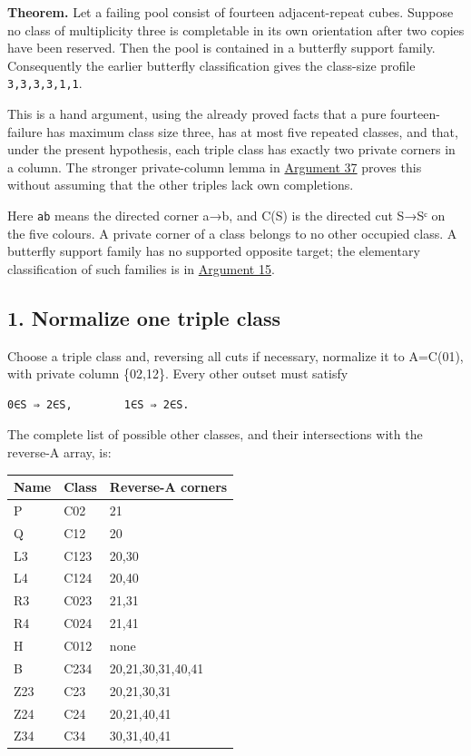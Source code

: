 \documentclass[
  10pt,
]{article}
\begin{document}
\textbf{Theorem.} Let a failing pool consist of fourteen adjacent-repeat
cubes. Suppose no class of multiplicity three is completable in its own
orientation after two copies have been reserved. Then the pool is
contained in a butterfly support family. Consequently the earlier
butterfly classification gives the class-size profile
\texttt{3,3,3,3,1,1}.

This is a hand argument, using the already proved facts that a pure
fourteen-failure has maximum class size three, has at most five repeated
classes, and that, under the present hypothesis, each triple class has
exactly two private corners in a column. The stronger private-column
lemma in \protect\hyperlink{arg-37}{Argument 37} proves this without
assuming that the other triples lack own completions.

Here \texttt{ab} means the directed corner a→b, and C(S) is the directed
cut S→Sᶜ on the five colours. A private corner of a class belongs to no
other occupied class. A butterfly support family has no supported
opposite target; the elementary classification of such families is in
\protect\hyperlink{arg-15}{Argument 15}.

\hypertarget{normalize-one-triple-class}{%
\subsection*{1. Normalize one triple
class}\label{normalize-one-triple-class}}

Choose a triple class and, reversing all cuts if necessary, normalize it
to A=C(01), with private column \{02,12\}. Every other outset must
satisfy

\begin{verbatim}
0∈S ⇒ 2∈S,        1∈S ⇒ 2∈S.
\end{verbatim}

The complete list of possible other classes, and their intersections
with the reverse-A array, is:

\begin{longtable}[]{@{}lll@{}}
\toprule\noalign{}
Name & Class & Reverse-A corners \\
\midrule\noalign{}
\endhead
\bottomrule\noalign{}
\endlastfoot
P & C02 & 21 \\
Q & C12 & 20 \\
L3 & C123 & 20,30 \\
L4 & C124 & 20,40 \\
R3 & C023 & 21,31 \\
R4 & C024 & 21,41 \\
H & C012 & none \\
B & C234 & 20,21,30,31,40,41 \\
Z23 & C23 & 20,21,30,31 \\
Z24 & C24 & 20,21,40,41 \\
Z34 & C34 & 30,31,40,41 \\
\end{longtable}
\end{document}
